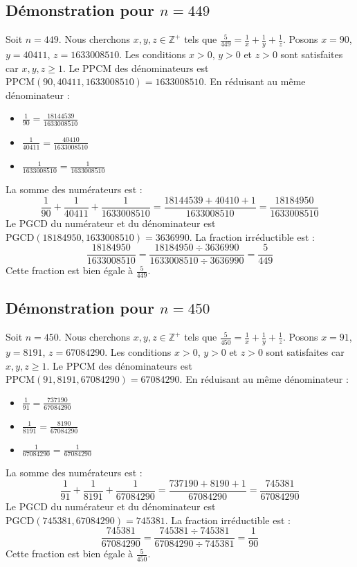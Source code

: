 \documentclass[11pt,a4paper]{article}
\begin{document}
\subsection{Démonstration pour $n = 449$}
Soit $n = 449$. Nous cherchons $x, y, z \in \mathbb{Z}^{+}$ tels que $\frac{5}{449} = \frac{1}{x} + \frac{1}{y} + \frac{1}{z}$.
Posons $x = 90$, $y = 40411$, $z = 1633008510$.
Les conditions $x > 0$, $y > 0$ et $z > 0$ sont satisfaites car $x, y, z \geq 1$.
Le PPCM des dénominateurs est $\text{PPCM}(90, 40411, 1633008510) = 1633008510$.
En réduisant au même dénominateur :
\begin{itemize}
    \item $\frac{1}{90} = \frac{18144539}{1633008510}$
    \item $\frac{1}{40411} = \frac{40410}{1633008510}$
    \item $\frac{1}{1633008510} = \frac{1}{1633008510}$
\end{itemize}
La somme des numérateurs est :
$$ \frac{1}{90} + \frac{1}{40411} + \frac{1}{1633008510} = \frac{18144539 + 40410 + 1}{1633008510} = \frac{18184950}{1633008510} $$
Le PGCD du numérateur et du dénominateur est $\text{PGCD}(18184950, 1633008510) = 3636990$.
La fraction irréductible est :
$$ \frac{18184950}{1633008510} = \frac{18184950 \div 3636990}{1633008510 \div 3636990} = \frac{5}{449} $$
Cette fraction est bien égale à $\frac{5}{449}$.

\subsection{Démonstration pour $n = 450$}
Soit $n = 450$. Nous cherchons $x, y, z \in \mathbb{Z}^{+}$ tels que $\frac{5}{450} = \frac{1}{x} + \frac{1}{y} + \frac{1}{z}$.
Posons $x = 91$, $y = 8191$, $z = 67084290$.
Les conditions $x > 0$, $y > 0$ et $z > 0$ sont satisfaites car $x, y, z \geq 1$.
Le PPCM des dénominateurs est $\text{PPCM}(91, 8191, 67084290) = 67084290$.
En réduisant au même dénominateur :
\begin{itemize}
    \item $\frac{1}{91} = \frac{737190}{67084290}$
    \item $\frac{1}{8191} = \frac{8190}{67084290}$
    \item $\frac{1}{67084290} = \frac{1}{67084290}$
\end{itemize}
La somme des numérateurs est :
$$ \frac{1}{91} + \frac{1}{8191} + \frac{1}{67084290} = \frac{737190 + 8190 + 1}{67084290} = \frac{745381}{67084290} $$
Le PGCD du numérateur et du dénominateur est $\text{PGCD}(745381, 67084290) = 745381$.
La fraction irréductible est :
$$ \frac{745381}{67084290} = \frac{745381 \div 745381}{67084290 \div 745381} = \frac{1}{90} $$
Cette fraction est bien égale à $\frac{5}{450}$.
\end{document}
